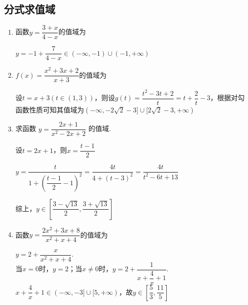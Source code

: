 \subsection*{分式求值域}
\begin{enumerate}
    \item 函数$y=\dfrac{3+x}{4-x}$的值域为
    \begin{jieda}
        $y=-1+\dfrac{7}{4-x}\in(-\infty,-1)\cup(-1,+\infty)$
    \end{jieda}

    \item $f(x) = \dfrac{x^2 + 3x + 2}{x+3}$的值域为\blkda[6]{$(-\infty, -2\sqrt{2}-3] \cup [2\sqrt{2}-3, +\infty)$}
    \begin{jieda}
        设$t = x+3 (t \in (1, 3))$，则设$g(t) = \dfrac{t^2-3t+2}{t} = t + \dfrac{2}{t} - 3$，根据对勾函数性质可知其值域为$(-\infty, -2\sqrt{2}-3] \cup [2\sqrt{2}-3, +\infty)$
    \end{jieda}
    
    \item 求函数 $y = \dfrac{{2x} + 1}{{x}^{2} - {2x} + 2}$ 的值域.
    \begin{jieda}
        设$t = 2x+1$，则$x = \dfrac{t-1}{2}$

        $y = \dfrac{t}{1 + \left(\dfrac{t-1}{2} - 1\right)^2} = \dfrac{4t}{4 + (t-3)^2} = \dfrac{4t}{t^2-6t+13}$

        \begin{dingautolist}{172}
            \item 当$t = 0$时，$y = 0$
            \item 当$t \neq 0$时，$y = \dfrac{4}{t+\dfrac{13}{t}-6}$

            $t + \dfrac{13}{t} \in (-\infty, -2\sqrt{13}] \cup [2\sqrt{13}, +\infty)$，故$t+\dfrac{13}{t}-6 \in (-\infty, -2\sqrt{13}-6] \cup [2\sqrt{13}-6, +\infty)$，故$y \in \left[\dfrac{3 - \sqrt{13}}{2}, 0\right)\cup\left(0, \dfrac{3 + \sqrt{13}}{2}\right]$
        \end{dingautolist}
        综上，$y \in \left\lbrack  {\dfrac{3 - \sqrt{13}}{2},\dfrac{3 + \sqrt{13}}{2}}\right\rbrack$
    \end{jieda}

    
    \item 函数$y=\dfrac{2x^2+3x+8}{x^2+x+4}$的值域为
    \begin{jieda}
        $y=2+\dfrac{x}{x^2+x+4}$. \\
        当$x = 0$时，$y = 2$；当$x \neq 0$时，$y = 2 + \dfrac{1}{x + \dfrac{4}{x} + 1}$.\\
        $x + \dfrac{4}{x} + 1 \in (-\infty, -3]\cup [5, +\infty)$，故$y \in \left[\dfrac{5}{3}, \dfrac{11}{5}\right]$
    \end{jieda}
    

\end{enumerate}
